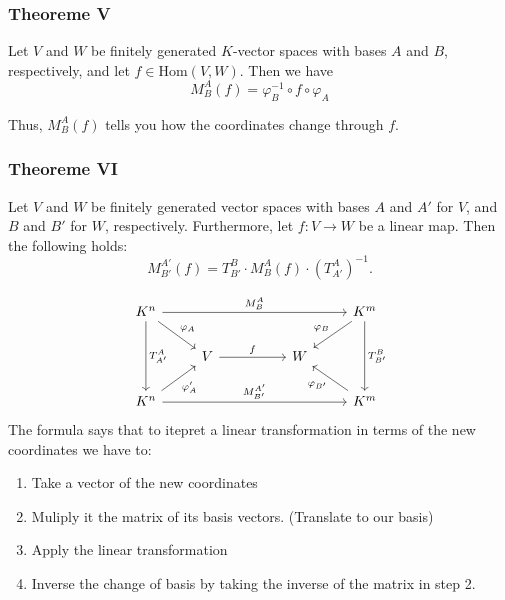 \subsubsection*{Theoreme V}
 
Let \( V \) and \( W \) be finitely 
generated \( K \)-vector spaces with 
bases \( A \) and \( B \), respectively, and let \( f \in \mathrm{Hom}(V, W) \).
Then we have
\[
M_B^A(f) = \varphi_B^{-1} \circ f \circ \varphi_A
\]

Thus, \( M_B^A(f) \) tells you how the coordinates change through \( f \).

\subsubsection*{Theoreme VI} 

Let \( V \) and \( W \) be finitely generated vector spaces with bases \( A \) and \( A' \) for \( V \), and \( B \) and \( B' \) for \( W \), respectively.  
Furthermore, let \( f: V \to W \) be a linear map. Then the following holds:
\[
M_{B'}^{A'}(f) = T_{B'}^{B} \cdot M_{B}^{A}(f) \cdot \left( T_{A'}^{A} \right)^{-1}.
\]

\[
    \begin{tikzcd}
        K^n \arrow[dd, "T_{A'}^{A}"] \arrow[rrrr, "M_{B}^{A}"] \arrow[rd, "\varphi_A"] &                   &  &   & K^m \arrow[dd, "T_{B'}^{B}"] \arrow[ld, "\varphi_B"'] \\
                                                                                       & V \arrow[rr, "f"] &  & W &                                                       \\
        K^n \arrow[rrrr, "M_{B'}^{A'}"] \arrow[ru, "\varphi_{A}'"']                    &                   &  &   & K^m \arrow[lu, "\varphi_{B'}"]                       
    \end{tikzcd}
\]
The formula says that to itepret a linear transformation in terms of the
new coordinates we have to:
\begin{enumerate}
    \item Take a vector of the new coordinates
    \item Muliply it the matrix of its basis vectors. (Translate to our basis)
    \item Apply the linear transformation
    \item Inverse the change of basis by taking the inverse of the 
    matrix in step 2.
\end{enumerate}

\newpage